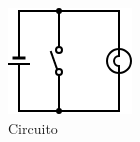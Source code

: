 \begin{frame}
\begin{columns}
		\begin{figure}[!htbp]
			\centering 
			\includegraphics[width=0.85\linewidth]{images/2_elettronica/logic_gate_circuit_not.png}
			\caption{Circuito}
		\end{figure}
		
	\end{columns}
	
\end{frame}



